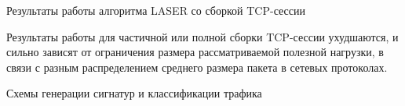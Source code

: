 \documentclass[10pt]{beamer}
\begin{document}
\begin{frame}{Результаты работы алгоритма LASER со сборкой TCP-сессии}

    \begin{table}[]
    \end{table}

    \begin{block}{}
        Результаты работы для частичной или полной сборки TCP-сессии ухудшаются,
        и сильно зависят от ограничения размера рассматриваемой полезной нагрузки,
        в связи с разным распределением среднего размера пакета в сетевых протоколах.
    \end{block}
\end{frame}

\begin{frame}{Схемы генерации сигнатур и классификации трафика}
    \begin{figure}
        \begin{adjustwidth}{-2em}{-2em}
            \centering
            
        \end{adjustwidth}
    \end{figure}
    \begin{figure}
        \begin{adjustwidth}{-2em}{-2em}
            \centering
            
        \end{adjustwidth}
    \end{figure}
\end{frame}
\end{document}
